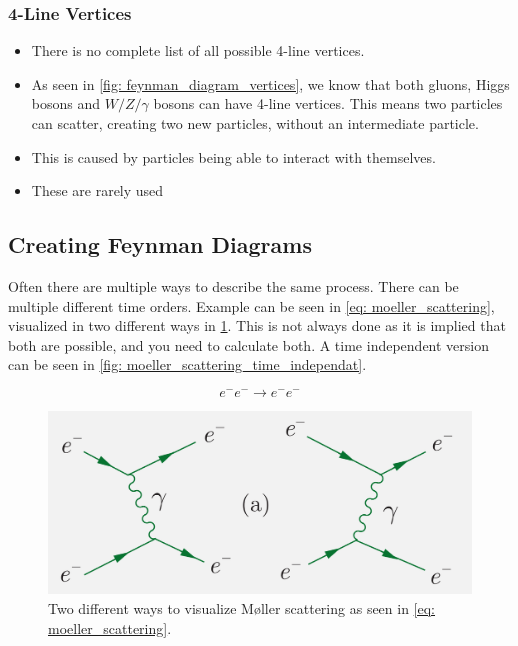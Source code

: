\subsubsection{4-Line Vertices}
\begin{itemize}
    \item There is no complete list of all possible 4-line vertices. 
    \item As seen in \cref{fig: feynman_diagram_vertices}, we know that both gluons, Higgs bosons and $W / Z / γ$  bosons can have 4-line vertices. This means two particles can scatter, creating two new particles, without an intermediate particle.
    \item This is caused by particles being able to interact with themselves. 
    \item These are rarely used
\end{itemize}

\subsection{Creating Feynman Diagrams}
Often there are multiple ways to describe the same process. There can be multiple different time orders. Example can be seen in \cref{eq: moeller_scattering}, visualized in two different ways in \cref{fig: moeller_scattering}. This is not always done as it is implied that both are possible, and you need to calculate both. A time independent version can be seen in \cref{fig: moeller_scattering_time_independat}.

\begin{equation}\label{eq: moeller_scattering}
    e^{-} e^{-} → e^{-} e^{-}
\end{equation}

\begin{figure}[ht!]
\centering
\includegraphics[width = .75\textwidth]{moeller_scattering.png}
\caption{Two different ways to visualize Møller scattering as seen in \cref{eq: moeller_scattering}.}
\label{fig: moeller_scattering}
\end{figure}

